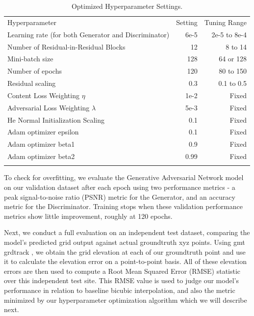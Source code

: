 \documentclass[tc, manuscript]{copernicus}
\begin{document}
\begin{table}[h]
\caption{Optimized Hyperparameter Settings.}
\label{table:1}
\begin{tabular}{lrr}
\tophline
Hyperparameter & Setting & Tuning Range \\
\middlehline
Learning rate (for both Generator and Discriminator) & 6e-5 & 2e-5 to 8e-4 \\
Number of Residual-in-Residual Blocks & 12 & 8 to 14 \\
Mini-batch size & 128 & 64 or 128 \\
Number of epochs & 120 & 80 to 150 \\
Residual scaling & 0.3 & 0.1 to 0.5 \\
Content Loss Weighting $\eta$ & 1e-2 & Fixed \\
Adversarial Loss Weighting $\lambda$ & 5e-3 & Fixed \\
He Normal Initialization Scaling & 0.1 & Fixed \\
Adam optimizer epsilon & 0.1 & Fixed \\
Adam optimizer beta1 & 0.9 & Fixed \\
Adam optimizer beta2 & 0.99 & Fixed \\
\bottomhline
\end{tabular}
\belowtable{} %
\end{table}

To check for overfitting, we evaluate the Generative Adversarial Network model on our validation dataset after each epoch using two performance metrics - a peak signal-to-noise ratio (PSNR) metric for the Generator, and an accuracy metric for the Discriminator.
Training stops when these validation performance metrics show little improvement, roughly at 120 epochs.

Next, we conduct a full evaluation on an independent test dataset, comparing the model's predicted grid output against actual groundtruth xyz points.
Using gmt grdtrack \citep{WesselGenericMappingTools2013}, we obtain the grid elevation at each of our groundtruth point and use it to calculate the elevation error on a point-to-point basis.
All of these elevation errors are then used to compute a Root Mean Squared Error (RMSE) statistic over this independent test site.
This RMSE value is used to judge our model's performance in relation to baseline bicubic interpolation, and also the metric minimized by our hyperparameter optimization algorithm which we will describe next.
\end{document}
